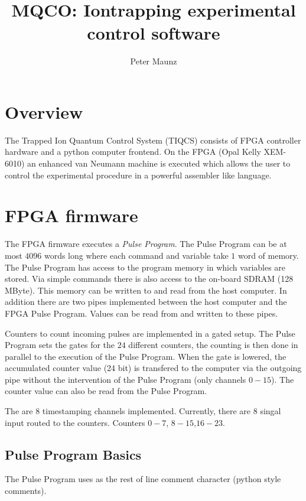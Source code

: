 \documentclass[11pt]{scrartcl}
\author{Peter Maunz}
\title{MQCO: Iontrapping experimental control software}
\begin{document}
\maketitle

\section{Overview}
The Trapped Ion Quantum Control System (TIQCS) consists of FPGA controller hardware and a python computer frontend. On the FPGA (Opal Kelly XEM-6010) an enhanced van Neumann machine is executed which allows the user to control the experimental procedure in a powerful assembler like language.

\section{FPGA firmware}

%

The FPGA firmware executes a {\it Pulse Program}. The Pulse Program can be at most $4096$ words long where each command and variable take $1$ word of memory. The Pulse Program has access to the program memory in which variables are stored. Via simple commands there is also access to the on-board SDRAM (128 MByte). This memory can be written to and read from the host computer. In addition there are two pipes implemented between the host computer and the FPGA Pulse Program. Values can be read from and written to these pipes.

Counters to count incoming pulses are implemented in a gated setup. The Pulse Program sets the gates for the $24$ different counters, the counting is then done in parallel to the execution of the Pulse Program. When the gate is lowered, the accumulated counter value (24 bit) is transfered to the computer via the outgoing pipe without the intervention of the Pulse Program (only channels $0-15$). The counter value can also be read from the Pulse Program.

The are $8$ timestamping channels implemented. Currently, there are $8$ singal input routed to the counters. Counters $0-7$, $8-15$,$16-23$. 

\subsection{Pulse Program Basics}
The Pulse Program uses \lit{\#} as the rest of line comment character (python style comments). 
\end{document}

